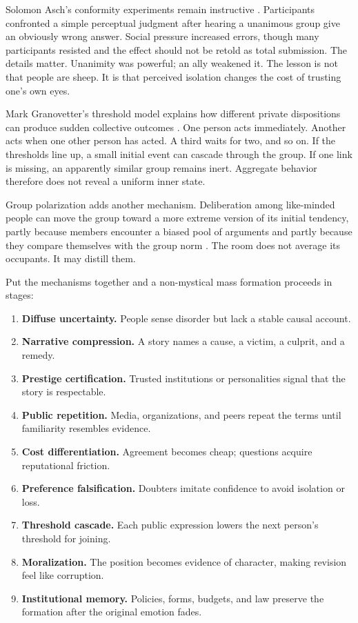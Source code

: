 ﻿\documentclass[12pt,a4paper]{book}
\begin{document}
Solomon Asch's conformity experiments remain instructive \cite{Asch1956}. Participants confronted a simple perceptual judgment after hearing a unanimous group give an obviously wrong answer. Social pressure increased errors, though many participants resisted and the effect should not be retold as total submission. The details matter. Unanimity was powerful; an ally weakened it. The lesson is not that people are sheep. It is that perceived isolation changes the cost of trusting one's own eyes.

Mark Granovetter's threshold model explains how different private dispositions can produce sudden collective outcomes \cite{Granovetter1978}. One person acts immediately. Another acts when one other person has acted. A third waits for two, and so on. If the thresholds line up, a small initial event can cascade through the group. If one link is missing, an apparently similar group remains inert. Aggregate behavior therefore does not reveal a uniform inner state.

Group polarization adds another mechanism. Deliberation among like-minded people can move the group toward a more extreme version of its initial tendency, partly because members encounter a biased pool of arguments and partly because they compare themselves with the group norm \cite{Sunstein2002}. The room does not average its occupants. It may distill them.

Put the mechanisms together and a non-mystical mass formation proceeds in stages:

\begin{enumerate}
  \item \textbf{Diffuse uncertainty.} People sense disorder but lack a stable causal account.
  \item \textbf{Narrative compression.} A story names a cause, a victim, a culprit, and a remedy.
  \item \textbf{Prestige certification.} Trusted institutions or personalities signal that the story is respectable.
  \item \textbf{Public repetition.} Media, organizations, and peers repeat the terms until familiarity resembles evidence.
  \item \textbf{Cost differentiation.} Agreement becomes cheap; questions acquire reputational friction.
  \item \textbf{Preference falsification.} Doubters imitate confidence to avoid isolation or loss.
  \item \textbf{Threshold cascade.} Each public expression lowers the next person's threshold for joining.
  \item \textbf{Moralization.} The position becomes evidence of character, making revision feel like corruption.
  \item \textbf{Institutional memory.} Policies, forms, budgets, and law preserve the formation after the original emotion fades.
\end{enumerate}
\end{document}
